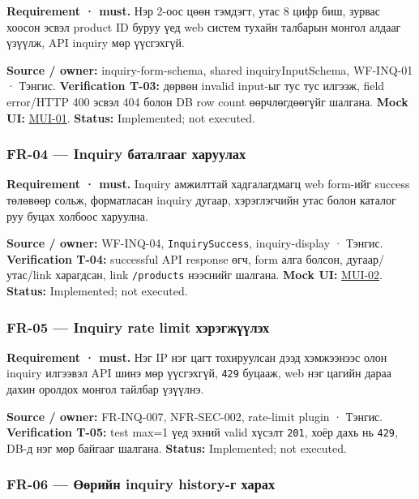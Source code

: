 \documentclass[
  mongolian,
]{article}
\begin{document}
\textbf{Requirement · must.} Нэр 2-оос цөөн тэмдэгт, утас 8 цифр биш,
зурвас хоосон эсвэл product ID буруу үед web систем тухайн талбарын
монгол алдааг үзүүлж, API inquiry мөр үүсгэхгүй.

\textbf{Source / owner:} inquiry-form-schema, shared inquiryInputSchema,
WF-INQ-01 · Тэнгис. \textbf{Verification T-03:} дөрвөн invalid input-ыг
тус тус илгээж, field error/HTTP 400 эсвэл 404 болон DB row count
өөрчлөгдөөгүйг шалгана. \textbf{Mock UI:}
\href{../assets/01-inquiry-form.png}{MUI-01}. \textbf{Status:}
Implemented; not executed.

\subsubsection{FR-04 --- Inquiry баталгааг
харуулах}\label{fr-04-inquiry-ux431ux430ux442ux430ux43bux433ux430ux430ux433-ux445ux430ux440ux443ux443ux43bux430ux445}

\textbf{Requirement · must.} Inquiry амжилттай хадгалагдмагц web
form-ийг success төлөвөөр сольж, форматласан inquiry дугаар,
хэрэглэгчийн утас болон каталог руу буцах холбоос харуулна.

\textbf{Source / owner:} WF-INQ-04, \texttt{InquirySuccess},
inquiry-display · Тэнгис. \textbf{Verification T-04:} successful API
response өгч, form алга болсон, дугаар/утас/link харагдсан, link
\texttt{/products} нээснийг шалгана. \textbf{Mock UI:}
\href{../assets/02-inquiry-success.png}{MUI-02}. \textbf{Status:}
Implemented; not executed.

\subsubsection{FR-05 --- Inquiry rate limit
хэрэгжүүлэх}\label{fr-05-inquiry-rate-limit-ux445ux44dux440ux44dux433ux436ux4afux4afux43bux44dux445}

\textbf{Requirement · must.} Нэг IP нэг цагт тохируулсан дээд хэмжээнээс
олон inquiry илгээвэл API шинэ мөр үүсгэхгүй, \texttt{429} буцааж, web
нэг цагийн дараа дахин оролдох монгол тайлбар үзүүлнэ.

\textbf{Source / owner:} FR-INQ-007, NFR-SEC-002, rate-limit plugin ·
Тэнгис. \textbf{Verification T-05:} test max=1 үед эхний valid хүсэлт
\texttt{201}, хоёр дахь нь \texttt{429}, DB-д нэг мөр байгааг шалгана.
\textbf{Status:} Implemented; not executed.

\subsubsection{FR-06 --- Өөрийн inquiry history-г
харах}\label{fr-06-ux4e9ux4e9ux440ux438ux439ux43d-inquiry-history-ux433-ux445ux430ux440ux430ux445}
\end{document}
